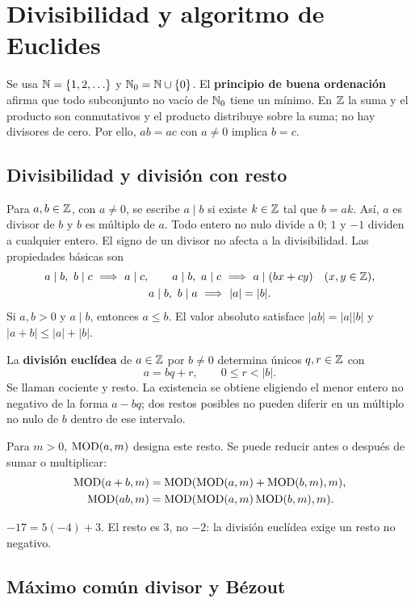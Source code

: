 \chapter{Divisibilidad y algoritmo de Euclides}
\label{md:division}

Se usa $\mathbb{N}=\{1,2,\ldots\}$ y $\mathbb{N}_0=\mathbb{N}\cup\{0\}$.
El \textbf{principio de buena ordenación} afirma que todo subconjunto
no vacío de $\mathbb{N}_0$ tiene un mínimo. En $\mathbb{Z}$ la suma y el producto son
conmutativos y el producto distribuye sobre la suma; no hay divisores
de cero. Por ello, $ab=ac$ con $a\ne0$ implica $b=c$.

\section{Divisibilidad y división con resto}
\label{md:divisibilidad}

Para $a,b\in\mathbb{Z}$, con $a\ne0$, se escribe $a\mid b$ si existe $k\in\mathbb{Z}$
tal que $b=ak$. Así, $a$ es divisor de $b$ y $b$ es múltiplo de $a$.
Todo entero no nulo divide a $0$; $1$ y $-1$ dividen a cualquier entero.
El signo de un divisor no afecta a la divisibilidad.
Las propiedades básicas son
\[
 \begin{gathered}
 a\mid b,\ b\mid c\ \Longrightarrow\ a\mid c,\qquad
 a\mid b,\ a\mid c\ \Longrightarrow\ a\mid(bx+cy)\quad(x,y\in\mathbb{Z}),\\
 a\mid b,\ b\mid a\ \Longrightarrow\ |a|=|b|.
 \end{gathered}
\]
Si $a,b>0$ y $a\mid b$, entonces $a\le b$.
El valor absoluto satisface $|ab|=|a||b|$ y
$|a+b|\le |a|+|b|$.

La \textbf{división euclídea} de $a\in\mathbb{Z}$ por $b\ne0$ determina
únicos $q,r\in\mathbb{Z}$ con
\[
 a=bq+r,\qquad 0\le r<|b|.
\]
Se llaman cociente y resto. La existencia se obtiene eligiendo el menor
entero no negativo de la forma $a-bq$; dos restos posibles no pueden
diferir en un múltiplo no nulo de $b$ dentro de ese intervalo.

Para $m>0$, $\operatorname{MOD}(a,m)$ designa este resto. Se puede reducir antes
o después de sumar o multiplicar:
\[
 \begin{aligned}
 \operatorname{MOD}(a+b,m)&=\operatorname{MOD}(\operatorname{MOD}(a,m)+\operatorname{MOD}(b,m),m),\\
 \operatorname{MOD}(ab,m)&=\operatorname{MOD}(\operatorname{MOD}(a,m)\operatorname{MOD}(b,m),m).
 \end{aligned}
\]
\begin{ejemplo}
$-17=5(-4)+3$. El resto es $3$, no $-2$: la división euclídea
exige un resto no negativo.
\end{ejemplo}

\section{Máximo común divisor y Bézout}
\label{md:bezout}

